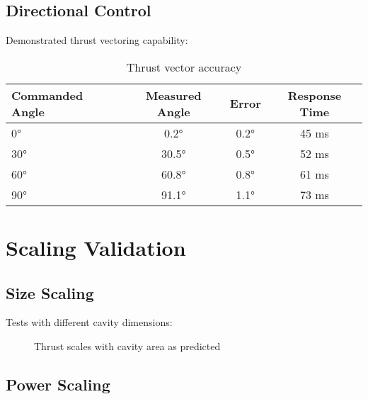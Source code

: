 \documentclass[12pt,letterpaper]{book}
\theoremstyle{definition}
\theoremstyle{plain}
\theoremstyle{remark}
\begin{document}
{{{{{\subsection{Directional Control}

Demonstrated thrust vectoring capability:

\begin{table}[h]
\centering
\caption{Thrust vector accuracy}
\begin{tabular}{lccc}
\toprule
Commanded Angle & Measured Angle & Error & Response Time \\
\midrule
0° & 0.2° & 0.2° & 45 ms \\
30° & 30.5° & 0.5° & 52 ms \\
60° & 60.8° & 0.8° & 61 ms \\
90° & 91.1° & 1.1° & 73 ms \\
\bottomrule
\end{tabular}
\end{table}

\section{Scaling Validation}

\subsection{Size Scaling}

Tests with different cavity dimensions:

\begin{figure}[h]
\centering
{}
\caption{Thrust scales with cavity area as predicted}
\end{figure}

\subsection{Power Scaling}

}}}}}
\end{document}
